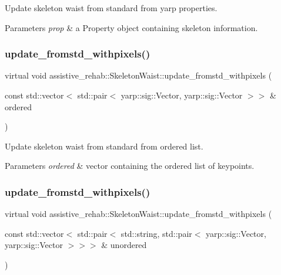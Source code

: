 Update skeleton waist from standard from yarp properties. 


\begin{DoxyParams}{Parameters}
{\em prop} & a Property object containing skeleton information. \\
\hline
\end{DoxyParams}
\mbox{\label{classassistive__rehab_1_1SkeletonWaist_ac18ad93c95f70de6398f79e3f3eedad1}} 
\subsubsection{\texorpdfstring{update\_fromstd\_withpixels()}{update\_fromstd\_withpixels()}\hspace{0.1cm}{\footnotesize\ttfamily [1/2]}}
{\footnotesize\ttfamily virtual void assistive\+\_\+rehab\+::\+Skeleton\+Waist\+::update\+\_\+fromstd\+\_\+withpixels (\begin{DoxyParamCaption}\item[{const std\+::vector$<$ std\+::pair$<$ yarp\+::sig\+::\+Vector, yarp\+::sig\+::\+Vector $>$$>$ \&}]{ordered }\end{DoxyParamCaption})\hspace{0.3cm}{\ttfamily [virtual]}}



Update skeleton waist from standard from ordered list. 


\begin{DoxyParams}{Parameters}
{\em ordered} & vector containing the ordered list of keypoints. \\
\hline
\end{DoxyParams}
\mbox{\label{classassistive__rehab_1_1SkeletonWaist_a50e77bb59f930e1be33ee0d3b39f74f8}} 
\subsubsection{\texorpdfstring{update\_fromstd\_withpixels()}{update\_fromstd\_withpixels()}\hspace{0.1cm}{\footnotesize\ttfamily [2/2]}}
{\footnotesize\ttfamily virtual void assistive\+\_\+rehab\+::\+Skeleton\+Waist\+::update\+\_\+fromstd\+\_\+withpixels (\begin{DoxyParamCaption}\item[{const std\+::vector$<$ std\+::pair$<$ std\+::string, std\+::pair$<$ yarp\+::sig\+::\+Vector, yarp\+::sig\+::\+Vector $>$$>$$>$ \&}]{unordered }\end{DoxyParamCaption})\hspace{0.3cm}{\ttfamily [virtual]}}



